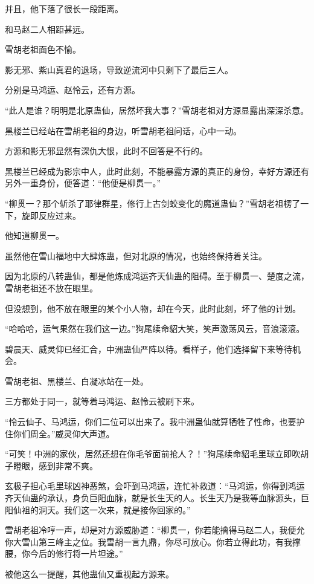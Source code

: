 \begin{this_body}
并且，他下落了很长一段距离。

和马赵二人相距甚远。

雪胡老祖面色不愉。

影无邪、紫山真君的退场，导致逆流河中只剩下了最后三人。

分别是马鸿运、赵怜云，还有方源。

“此人是谁？明明是北原蛊仙，居然坏我大事？”雪胡老祖对方源显露出深深杀意。

黑楼兰已经站在雪胡老祖的身边，听雪胡老祖问话，心中一动。

方源和影无邪显然有深仇大恨，此时不回答是不行的。

黑楼兰已经成为影宗中人，此时此刻，不能暴露方源的真正的身份，幸好方源还有另外一重身份，便答道：“他便是柳贯一。”

“柳贯一？那个斩杀了耶律群星，修行上古剑蛟变化的魔道蛊仙？”雪胡老祖楞了一下，旋即反应过来。

他知道柳贯一。

虽然他在雪山福地中大肆炼蛊，但对北原的情况，也始终保持着关注。

因为北原的八转蛊仙，都是他炼成鸿运齐天仙蛊的阻碍。至于柳贯一、楚度之流，雪胡老祖还不放在眼里。

但没想到，他不放在眼里的某个小人物，却在今天，此时此刻，坏了他的计划。

“哈哈哈，运气果然在我们这一边。”狗尾续命貂大笑，笑声激荡风云，音浪滚滚。

碧晨天、威灵仰已经汇合，中洲蛊仙严阵以待。看样子，他们选择留下来等待机会。

雪胡老祖、黑楼兰、白凝冰站在一处。

三方都处于同一，就等着马鸿运、赵怜云被刷下来。

“怜云仙子、马鸿运，你们二位可以出来了。我中洲蛊仙就算牺牲了性命，也要护住你们周全。”威灵仰大声道。

“可笑！中洲的家伙，居然还想在你毛爷面前抢人？！”狗尾续命貂毛里球立即吹胡子瞪眼，感到非常不爽。

玄极子担心毛里球凶神恶煞，会吓到马鸿运，连忙补救道：“马鸿运，你得到鸿运齐天仙蛊的承认，身负巨阳血脉，就是长生天的人。长生天乃是我等血脉源头，巨阳仙祖的洞天。我们这一次来，就是接你回家的。”

雪胡老祖冷哼一声，却是对方源威胁道：“柳贯一，你若能擒得马赵二人，我便允你大雪山第三峰主之位。我雪胡一言九鼎，你尽可放心。你若立得此功，有我撑腰，你今后的修行将一片坦途。”

被他这么一提醒，其他蛊仙又重视起方源来。


\end{this_body}
